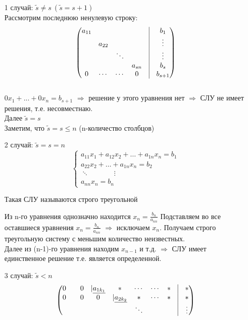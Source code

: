 \documentclass[a4paper, 12pt]{article}
\theoremstyle{definition}
\begin{document}
  \begin{itemize}
    \item[1 случай:]
    $\widetilde{s} \neq s \ (\widetilde{s}=s+1)$ \\ 
    Рассмотрим последнюю ненулевую строку:
    $$\begin{pmatrix}
      a_{11} & \null & \null & \null & \vline & b_1 \\
      \null & a_{22} & \null & \null & \vline & \vdots \\
      \null & \null & \ddots & \null & \vline & \vdots \\
      \null & \null & \null & a_{sn} & \vline & b_s \\
      0 & \cdots & \cdots & 0 & \vline & b_{s+1}
    \end{pmatrix}$$ \\
    $0x_1+...+0x_n=b_{s+1}$ 
    $\Longrightarrow$ решение у этого уравнения нет 
    $\Longrightarrow$ СЛУ не имеет решения, т.е. несовместнаю. \\
    Далее $\widetilde{s}=s$\\
    Заметим, что $\widetilde{s}=s\leq n$ (n-количество столбцов)
    \item[2 случай:] $\widetilde{s}=s=n$  
    $$\left\{ \begin{aligned}
      a_{11} x_1 + a_{12} x_2+ \dots + a_{1n} x_n = b_1 \\
      a_{22} x_2 + \dots + a_{1n} x_n = b_2 \\ 
      \ddots \ \ \ \ \ \ \ \ \ \ \ \ \ \ \ \ \vdots \ \\
      a_{nn} x_n = b_n
    \end{aligned}
    \right.$$

    Такая СЛУ называются строго треугольной

    Из n-го уравнения однозначно находится $x_n = \frac{b_n}{a_{nn}}$
    Подставляем во все оставшиеся уравнения $x_n = \frac{b_n}{a_{nn}}$ $\Longrightarrow$ исключаем $x_n$. Получаем строго треугольную систему с меньшим количество неизвестных.  \\
    Далее из (n-1)-го уравнения  находим $x_{n-1}$ и т.д. $\Longrightarrow$ СЛУ имеет единственное решение т.е. является определенной.

    \item[3 случай:] $\widetilde{s}<n$ 
  $$\begin{pmatrix}
    0 & \null & 0 & |\underline{a_{1k_1}} & \ast & \cdots & \cdots & \ast & \vline & \ast  \\
    0 & \null & 0 & 0 & |\underline{a_{2k_2}} & \ast & \cdots & \ast & \vline & \ast \\
    \null & \null & \null & \null & \null & \ddots & \null & \null & \vline & \vdots
  \end{pmatrix}$$ 


\end{itemize}
\end{document}
